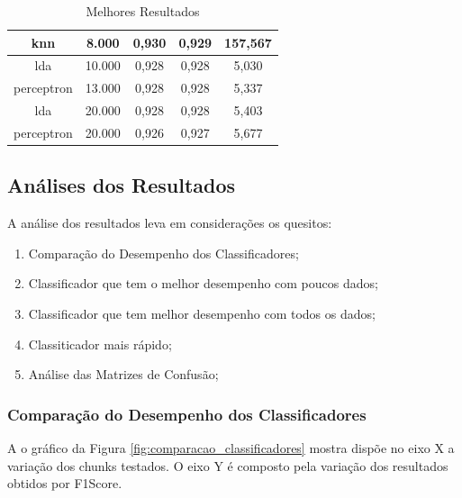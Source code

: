 \documentclass[12pt]{article}
\begin{document}
\begin{table}[!htb]
\begin{tabular}{|c|c|c|c|c|}
knn                 & 8.000          & 0,930            & 0,929             & 157,567                     \\ \hline
lda                 & 10.000         & 0,928            & 0,928             & 5,030                       \\ \hline
perceptron          & 13.000         & 0,928            & 0,928             & 5,337                       \\ \hline
lda                 & 20.000         & 0,928            & 0,928             & 5,403                       \\ \hline
perceptron          & 20.000         & 0,926            & 0,927             & 5,677                       \\ \hline
\end{tabular}
  \caption{Melhores Resultados}
  \label{tab:resultados_melhores}
\end{table}

\subsection{Análises dos Resultados}

A análise dos resultados leva em considerações os quesitos:

\begin{enumerate}
  \item Comparação do Desempenho dos Classificadores;
  \item Classificador que tem o melhor desempenho com poucos dados;
  \item Classificador que tem melhor desempenho com todos os dados;
  \item Classiticador mais rápido;
  \item Análise das Matrizes de Confusão;
\end{enumerate}

\subsubsection{Comparação do Desempenho dos Classificadores}

A o gráfico da Figura \ref{fig:comparacao_classificadores} mostra dispõe no eixo X a variação dos chunks testados. O eixo Y é composto pela variação dos resultados obtidos por F1Score.
\end{document}
